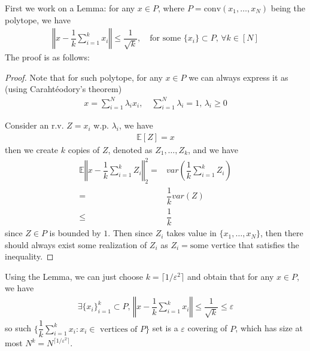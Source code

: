\documentclass[11pt,a4paper]{article}
\numberwithin{equation}{section}%
\begin{document}
First we work on a Lemma: for any $ x\in P $, where $ P = \mathrm{conv}(x_1,\ldots,x_N) $ being the polytope, we have 
\begin{align*}
    \left\Vert x- \dfrac{ 1 }{ k } \sum_{i=1}^k x_i \right\Vert  \leq \dfrac{ 1 }{ \sqrt{k} } ,\quad \text{for some } \{x_i\}\subset P,\,\forall k\in [N]
\end{align*}
The proof is as follows:
\begin{proof}
    Note that for such polytope, for any $ x\in P $ we can always express it as (using Carahtéodory's theorem)
    \begin{align*}
        x = \sum_{i=1}^N \lambda _ix_i,\quad \sum_{i=1}^N \lambda _i = 1,\,\lambda _i\geq 0
    \end{align*}
    
    Consider an r.v. $ Z = x_i $ w.p. $ \lambda _i $, we have
    \begin{align*}
        \mathbb{E}\left[ Z \right] = x 
    \end{align*}
    then we create $ k $ copies of $ Z $, denoted as $ Z_1,\ldots,Z_k $, and we have
    \begin{align*}
        \mathbb{E}\left\Vert x- \dfrac{ 1 }{ k } \sum_{i=1}^k Z_i \right\Vert _2^2 =&  var(\dfrac{ 1 }{ k } \sum_{i=1}^k Z_i)\\
        =& \dfrac{ 1 }{ k }var(Z)\\
        \leq & \dfrac{ 1 }{ k } 
    \end{align*}
    since $ Z \in P $ is bounded by $ 1 $. Then since $ Z_i $ takes value in $ \{x_1,\ldots,x_N\} $, then there should always exist some realization of $ Z_i $ as $ Z_i = \text{some vertice} $ that satisfies the inequality.
\end{proof}

Using the Lemma, we can just choose $ k=\lceil 1/\varepsilon ^2 \rceil $ and obtain that for any $ x\in P $, we have
\begin{align*}
    \exists \{x_i\}_{i=1}^k\subset P,\, \left\Vert x- \dfrac{ 1 }{ k } \sum_{i=1}^k x_i \right\Vert  \leq \dfrac{ 1 }{ \sqrt{k} } \leq \varepsilon  
\end{align*}
so such $ \{\dfrac{ 1 }{ k }\sum_{i=1}^k x_i: x_i\in\text{ vertices of }P\}  $ set is a $ \varepsilon  $ covering of $ P $, which has size at most $ N^k = N^{\lceil 1/\varepsilon ^2 \rceil} $. 




\section{}
\end{document}
